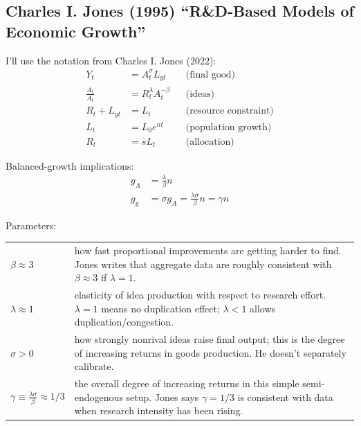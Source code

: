 \documentclass[
  11pt,
  letterpaper,
  DIV=11,
  numbers=noendperiod]{scrartcl}
\begin{document}
\subsection{Charles I. Jones (1995) ``R\&D-Based Models of Economic
Growth''}\label{jones1995rd-rd-based-models-of-economic-growth}

I'll use the notation from Charles I. Jones (2022): \[\begin{aligned}
    Y_t &= A_t^\sigma L_{yt} 
        && \text{(final good)} \\
    \frac{\dot{A_t}}{A_t} &= R_t^\lambda A_t^{-\beta}
        && \text{(ideas)} \\
    R_t+L_{yt} &= L_t
        && \text{(resource constraint)} \\
    L_t &= L_0 e^{nt}
        && \text{(population growth)} \\
    R_t &= \bar{s}L_t
        && \text{(allocation)}
\end{aligned}
\]

Balanced-growth implications: \[\begin{aligned}
    g_A &= \frac{\lambda}{\beta}n \\
    g_y &= \sigma g_A = \frac{\lambda\sigma}{\beta}n = \gamma n
\end{aligned}
\]

Parameters:

\begin{longtable}[]{@{}
  >{\centering\arraybackslash}p{}
  >{\raggedright\arraybackslash}p{}@{}}
\toprule\noalign{}
\endhead
\bottomrule\noalign{}
\endlastfoot
\(\beta \approx 3\) & how fast proportional improvements are getting
harder to find. Jones writes that aggregate data are roughly consistent
with \(\beta \approx 3\) if \(\lambda = 1\). \\
\(\lambda \approx 1\) & elasticity of idea production with respect to
research effort. \(\lambda = 1\) means no duplication effect;
\(\lambda < 1\) allows duplication/congestion. \\
\(\sigma > 0\) & how strongly nonrival ideas raise final output; this is
the degree of increasing returns in goods production. He doesn't
separately calibrate. \\
\(\gamma \equiv \frac{\lambda\sigma}{\beta} \approx 1/3\) & the overall
degree of increasing returns in this simple semi-endogenous setup. Jones
says \(\gamma = 1/3\) is consistent with data when research intensity
has been rising. \\
\end{longtable}
\end{document}
